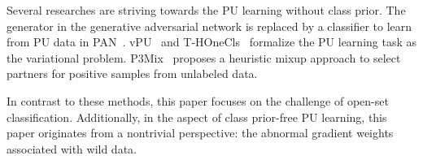 Several researches are striving towards the PU learning without class prior. The generator in the generative adversarial network is replaced by a classifier to learn from PU data in PAN~\cite{PAN}. vPU~\cite{vPU} and T-HOneCls~\cite{T-HOneCls} formalize the PU learning task as the variational problem. P3Mix~\cite{p3mix} proposes a heuristic mixup approach to select partners for positive samples from unlabeled data.

In contrast to these methods, this paper focuses on the challenge of open-set classification. Additionally, in the aspect of class prior-free PU learning, this paper originates from a nontrivial perspective: the abnormal gradient weights associated with wild data.